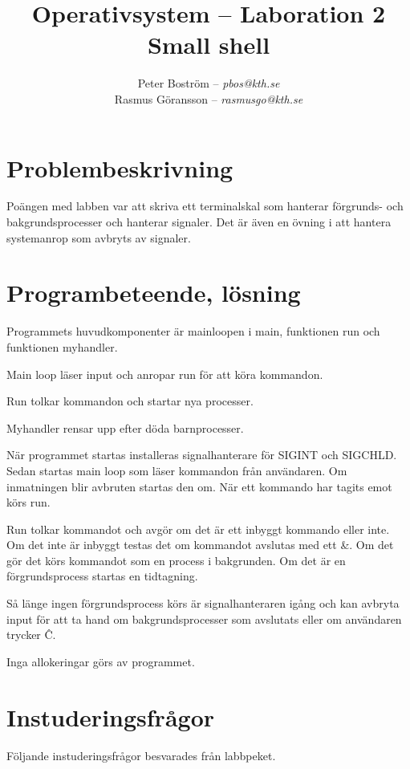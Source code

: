 \documentclass[a4paper,11pt]{article}
\title{Operativsystem -- Laboration 2\\\vspace{4pt}\normalsize Small shell}
\author{Peter Boström -- \emph{pbos@kth.se}\\
	Rasmus Göransson -- \emph{rasmusgo@kth.se}}
\begin{document}
\maketitle
\pagestyle{fancyplain}

\section*{Problembeskrivning}

Poängen med labben var att skriva ett terminalskal som hanterar förgrunds- och bakgrundsprocesser och hanterar signaler. Det är även en övning i att hantera systemanrop som avbryts av signaler.

\section*{Programbeteende, lösning}

Programmets huvudkomponenter är mainloopen i main, funktionen run och funktionen myhandler.

Main loop läser input och anropar run för att köra kommandon.

Run tolkar kommandon och startar nya processer.

Myhandler rensar upp efter döda barnprocesser.

När programmet startas installeras signalhanterare för SIGINT och SIGCHLD. Sedan startas main loop som läser kommandon från användaren. Om inmatningen blir avbruten startas den om. När ett kommando har tagits emot körs run.

Run tolkar kommandot och avgör om det är ett inbyggt kommando eller inte. Om det inte är inbyggt testas det om kommandot avslutas med ett \&. Om det gör det körs kommandot som en process i bakgrunden. Om det är en förgrundsprocess startas en tidtagning.

Så länge ingen förgrundsprocess körs är signalhanteraren igång och kan avbryta input för att ta hand om bakgrundsprocesser som avslutats eller om användaren trycker \^C.

Inga allokeringar görs av programmet.

\section*{Instuderingsfrågor}

Följande instuderingsfrågor besvarades från labbpeket.
\end{document}
